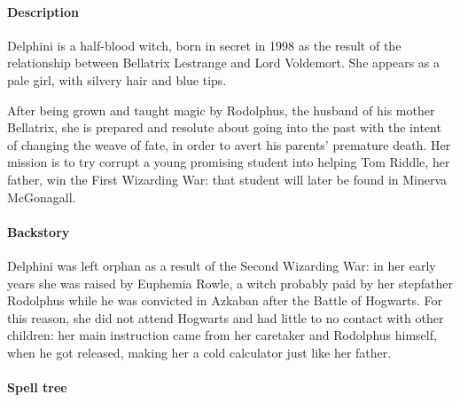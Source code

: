 
\paragraph{Description}
Delphini is a half-blood witch, born in secret in 1998 as the result of the relationship between Bellatrix Lestrange and Lord Voldemort. She appears as a pale girl, with silvery hair and blue tips.

After being grown and taught magic by Rodolphus, the husband of his mother Bellatrix, she is prepared and resolute about going into the past with the intent of changing the weave of fate, in order to avert his parents' premature death. Her mission is to try corrupt a young promising student into helping Tom Riddle, her father, win the First Wizarding War: that student will later be found in Minerva McGonagall. 

\paragraph{Backstory}
Delphini was left orphan as a result of the Second Wizarding War: in her early years she was raised by Euphemia Rowle, a witch probably paid by her stepfather Rodolphus while he was convicted in Azkaban after the Battle of Hogwarts. For this reason, she did not attend Hogwarts and had little to no contact with other children: her main instruction came from her caretaker and Rodolphus himself, when he got released, making her a cold calculator just like her father.
\pagebreak 

\pagebreak 
{} 
\pagebreak
\paragraph{Spell tree}
\clearpage